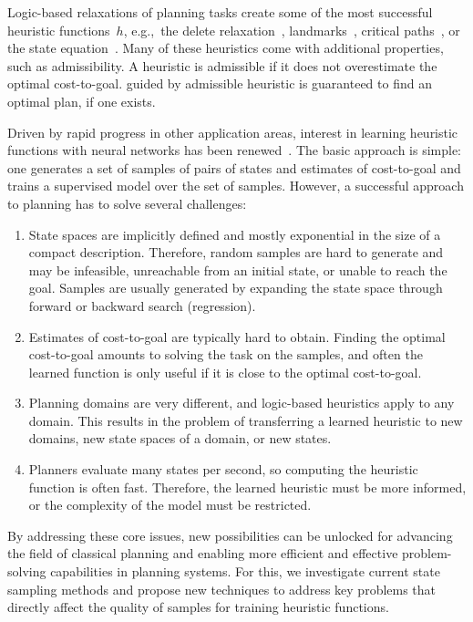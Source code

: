 Logic-based relaxations of planning tasks create some of the most successful heuristic functions~$h$, e.g.,~the delete relaxation~\cite{Hoffmann.Nebel/2001}, landmarks~\cite{hoffmann-et-al-jair2004,Karpas.Domshlak/2009}, critical paths~\cite{haslum-geffner-aips2000}, or the state equation~\cite{bonet-ijcai2013}. Many of these heuristics come with additional properties, such as admissibility. A heuristic is admissible if it does not overestimate the optimal cost-to-goal. \astar guided by admissible heuristic is guaranteed to find an optimal plan, if one exists.

Driven by rapid progress in other application areas, interest in learning heuristic functions with neural networks has been renewed~\cite{samadi-et-al-aaai2008,Arfaee.etal/2011,Agostinelli.etal/2019,Yu.etal/2020,Shen.etal/2020,Ferber.etal/2020a,Toyer.etal/2020,Ferber.etal/2022,OToole/2022}. The basic approach is simple: one generates a set of samples of pairs of states and estimates of cost-to-goal and trains a supervised model over the set of samples. However, a successful approach to planning has to solve several challenges:

\begin{enumerate}[label=C\arabic*),left=0pt]
    \itemsep0pt
    \item State spaces are implicitly defined and mostly exponential in the size of a compact description. Therefore, random samples are hard to generate and may be infeasible, unreachable from an initial state, or unable to reach the goal. Samples are usually generated by expanding the state space through forward or backward search (regression).
    \item Estimates of cost-to-goal are typically hard to obtain. Finding the optimal cost-to-goal amounts to solving the task on the samples, and often the learned function is only useful if it is close to the optimal cost-to-goal.
    \item Planning domains are very different, and logic-based heuristics apply to any domain. This results in the problem of transferring a learned heuristic to new domains, new state spaces of a domain, or new states.
    \item Planners evaluate many states per second, so computing the heuristic function is often fast. Therefore, the learned heuristic must be more informed, or the complexity of the model must be restricted.
\end{enumerate}

By addressing these core issues, new possibilities can be unlocked for advancing the field of classical planning and enabling more efficient and effective problem-solving capabilities in planning systems.  For this, we investigate current state sampling methods and propose new techniques to address key problems that directly affect the quality of samples for training heuristic functions.

